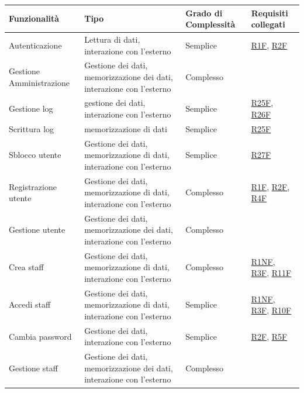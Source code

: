 \documentclass[a4paper]{article}
\begin{document}
\begin{center}
    \begin{tabularx}{1\textwidth}{|X|X|X|X|}
        \hline
        \textbf{Funzionalità} & \textbf{Tipo} & \textbf{Grado di Complessità} & \textbf{Requisiti collegati}\\
        \hline
        \hline
        Autenticazione & Lettura di dati, interazione con l'esterno & Semplice & \hyperlink{R1F}{R1F}, \hyperlink{R2F}{R2F} \\
        \hline
        Gestione Amministrazione & Gestione dei dati, memorizzazione dei dati, interazione con l'esterno & Complesso & \\
        \hline
        Gestione log & gestione dei dati, interazione con l'esterno & Semplice & \hyperlink{R25F}{R25F}, \hyperlink{R26F}{R26F}\\
        \hline
        Scrittura log & memorizzazione di dati & Semplice & \hyperlink{R25F}{R25F}\\
        \hline
        Sblocco utente & Gestione dei dati, memorizzazione di dati, interazione con l'esterno & Semplice & \hyperlink{R27F}{R27F}\\
        \hline
        Registrazione utente & Gestione dei dati, memorizzazione di dati, interazione con l'esterno & Complesso & \hyperlink{R1F}{R1F}, \hyperlink{R2F}{R2F}, \hyperlink{R4F}{R4F} \\
        \hline
        Gestione utente & Gestione dei dati, memorizzazione dei dati, interazione con l'esterno & Complesso & \\
        \hline
        Crea staff & Gestione dei dati, memorizzazione di dati, interazione con l'esterno & Complesso & \hyperlink{R1NF}{R1NF}, \hyperlink{R3F}{R3F}, \hyperlink{R11F}{R11F}\\
        \hline
        Accedi staff & Gestione dei dati, memorizzazione di dati, interazione con l'esterno & Semplice & \hyperlink{R1NF}{R1NF}, \hyperlink{R3F}{R3F}, \hyperlink{R10F}{R10F} \\
        \hline
        Cambia password & Gestione dei dati, interazione con l'esterno & Semplice & \hyperlink{R2F}{R2F}, \hyperlink{R5F}{R5F} \\
        \hline
        Gestione staff & Gestione dei dati, memorizzazione dei dati, interazione con l'esterno & Complesso &  \\
        \hline

\end{tabularx}
\end{center}
\end{document}
